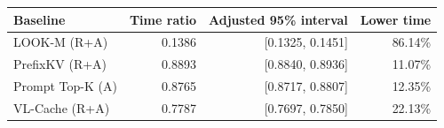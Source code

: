 \begin{tabular}{lrrr}
\toprule
Baseline & Time ratio & Adjusted 95\% interval & Lower time\\
\midrule
LOOK-M (R+A) & 0.1386 & [0.1325, 0.1451] & 86.14\%\\
PrefixKV (R+A) & 0.8893 & [0.8840, 0.8936] & 11.07\%\\
Prompt Top-K (A) & 0.8765 & [0.8717, 0.8807] & 12.35\%\\
VL-Cache (R+A) & 0.7787 & [0.7697, 0.7850] & 22.13\%\\
\bottomrule
\end{tabular}
